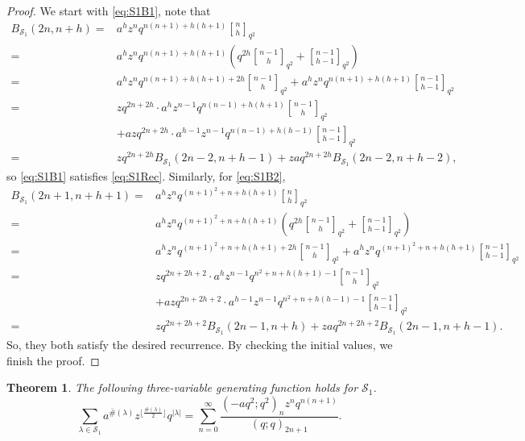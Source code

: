 \documentclass[11pt]{amsart}
\newtheorem{theorem}{Theorem}[section]
\theoremstyle{definition}
\theoremstyle{remark}
\numberwithin{equation}{section}
\begin{document}
\begin{proof}
We start with \eqref{eq:S1B1}, note that
\begin{align*}
B_{\mathcal S_1}(2n,n+h)=&a^hz^nq^{n(n+1)+h(h+1)}{n\brack h}_{q^2}\\
=&a^hz^nq^{n(n+1)+h(h+1)}\left(q^{2h}{n-1\brack h}_{q^2}+{n-1\brack h-1}_{q^2}\right)\\
=&a^hz^nq^{n(n+1)+h(h+1)+2h}{n-1\brack h}_{q^2}+a^hz^nq^{n(n+1)+h(h+1)}{n-1\brack h-1}_{q^2}\\
=&zq^{2n+2h}\cdot a^hz^{n-1}q^{n(n-1)+h(h+1)}{n-1\brack h}_{q^2}\\
&+azq^{2n+2h}\cdot a^{h-1}z^{n-1}q^{n(n-1)+h(h-1)}{n-1\brack h-1}_{q^2}\\
=&zq^{2n+2h}B_{\mathcal S_1}(2n-2,n+h-1)+zaq^{2n+2h}B_{\mathcal S_1}(2n-2,n+h-2),
\end{align*}
so \eqref{eq:S1B1} satisfies \eqref{eq:S1Rec}. Similarly, for \eqref{eq:S1B2},
\begin{align*}
B_{\mathcal S_1}(2n+1,n+h+1)=&a^hz^nq^{(n+1)^2+n+h(h+1)}{n\brack h}_{q^2}\\
=&a^hz^nq^{(n+1)^2+n+h(h+1)}\left(q^{2h}{n-1\brack h}_{q^2}+{n-1\brack h-1}_{q^2}\right)\\
=&a^hz^nq^{(n+1)^2+n+h(h+1)+2h}{n-1\brack h}_{q^2}+a^hz^nq^{(n+1)^2+n+h(h+1)}{n-1\brack h-1}_{q^2}\\
=&zq^{2n+2h+2}\cdot a^hz^{n-1}q^{n^2+n+h(h+1)-1}{n-1\brack h}_{q^2}\\
&+azq^{2n+2h+2}\cdot a^{h-1}z^{n-1}q^{n^2+n+h(h-1)-1}{n-1\brack h-1}_{q^2}\\
=&zq^{2n+2h+2}B_{\mathcal S_1}(2n-1,n+h)+zaq^{2n+2h+2}B_{\mathcal S_1}(2n-1,n+h-1).
\end{align*}
So, they both satisfy the desired recurrence. By checking the initial values, we finish the proof.
\end{proof}

\begin{theorem}\label{thm:S1}
The following three-variable generating function holds for $\mathcal{S}_1$.
\begin{equation}\label{eq:azS1}
\sum_{\lambda\in\mathcal{S}_1}a^{\overline{\#}(\lambda)}z^{\lfloor\frac{\#(\lambda)}{2}\rfloor}q^{|\lambda|}=\sum_{n=0}^{\infty}\frac{(-aq^2;q^2)_{n}z^nq^{n(n+1)}}{(q;q)_{2n+1}}.
\end{equation}
\end{theorem}
\end{document}
